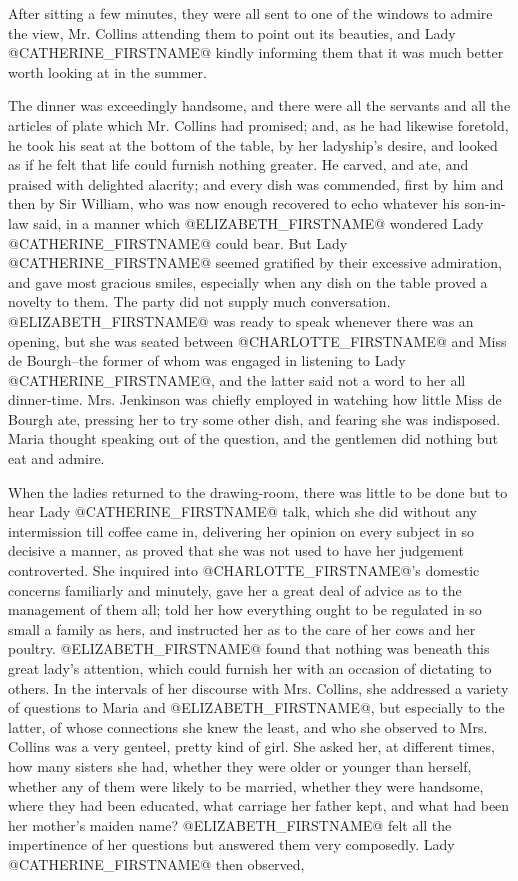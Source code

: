 After sitting a few minutes, they were all sent to one of the windows to
admire the view, Mr. Collins attending them to point out its beauties,
and Lady @CATHERINE_FIRSTNAME@ kindly informing them that it was much better worth
looking at in the summer.

The dinner was exceedingly handsome, and there were all the servants and
all the articles of plate which Mr. Collins had promised; and, as he had
likewise foretold, he took his seat at the bottom of the table, by her
ladyship's desire, and looked as if he felt that life could furnish
nothing greater. He carved, and ate, and praised with delighted
alacrity; and every dish was commended, first by him and then by Sir
William, who was now enough recovered to echo whatever his son-in-law
said, in a manner which @ELIZABETH_FIRSTNAME@ wondered Lady @CATHERINE_FIRSTNAME@ could bear.
But Lady @CATHERINE_FIRSTNAME@ seemed gratified by their excessive admiration, and
gave most gracious smiles, especially when any dish on the table proved
a novelty to them. The party did not supply much conversation. @ELIZABETH_FIRSTNAME@
was ready to speak whenever there was an opening, but she was seated
between @CHARLOTTE_FIRSTNAME@ and Miss de Bourgh--the former of whom was engaged in
listening to Lady @CATHERINE_FIRSTNAME@, and the latter said not a word to her all
dinner-time. Mrs. Jenkinson was chiefly employed in watching how little
Miss de Bourgh ate, pressing her to try some other dish, and fearing
she was indisposed. Maria thought speaking out of the question, and the
gentlemen did nothing but eat and admire.

When the ladies returned to the drawing-room, there was little to
be done but to hear Lady @CATHERINE_FIRSTNAME@ talk, which she did without any
intermission till coffee came in, delivering her opinion on every
subject in so decisive a manner, as proved that she was not used to
have her judgement controverted. She inquired into @CHARLOTTE_FIRSTNAME@'s domestic
concerns familiarly and minutely, gave her a great deal of advice as
to the management of them all; told her how everything ought to be
regulated in so small a family as hers, and instructed her as to the
care of her cows and her poultry. @ELIZABETH_FIRSTNAME@ found that nothing was
beneath this great lady's attention, which could furnish her with an
occasion of dictating to others. In the intervals of her discourse
with Mrs. Collins, she addressed a variety of questions to Maria and
@ELIZABETH_FIRSTNAME@, but especially to the latter, of whose connections she knew
the least, and who she observed to Mrs. Collins was a very genteel,
pretty kind of girl. She asked her, at different times, how many sisters
she had, whether they were older or younger than herself, whether any of
them were likely to be married, whether they were handsome, where they
had been educated, what carriage her father kept, and what had been
her mother's maiden name? @ELIZABETH_FIRSTNAME@ felt all the impertinence of
her questions but answered them very composedly. Lady @CATHERINE_FIRSTNAME@ then
observed,

